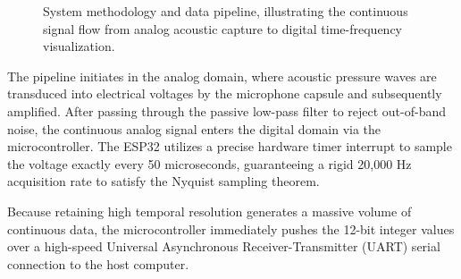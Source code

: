 \begin{figure}[htbp]
\centering
{}
\caption{System methodology and data pipeline, illustrating the continuous signal flow from analog acoustic capture to digital time-frequency visualization.}
\label{fig:data_pipeline}
\end{figure}

The pipeline initiates in the analog domain, where acoustic pressure waves are transduced into electrical voltages by the microphone capsule and subsequently amplified. After passing through the passive low-pass filter to reject out-of-band noise, the continuous analog signal enters the digital domain via the microcontroller. The ESP32 utilizes a precise hardware timer interrupt to sample the voltage exactly every 50 microseconds, guaranteeing a rigid 20,000 Hz acquisition rate to satisfy the Nyquist sampling theorem.

Because retaining high temporal resolution generates a massive volume of continuous data, the microcontroller immediately pushes the 12-bit integer values over a high-speed Universal Asynchronous Receiver-Transmitter (UART) serial connection to the host computer. 

